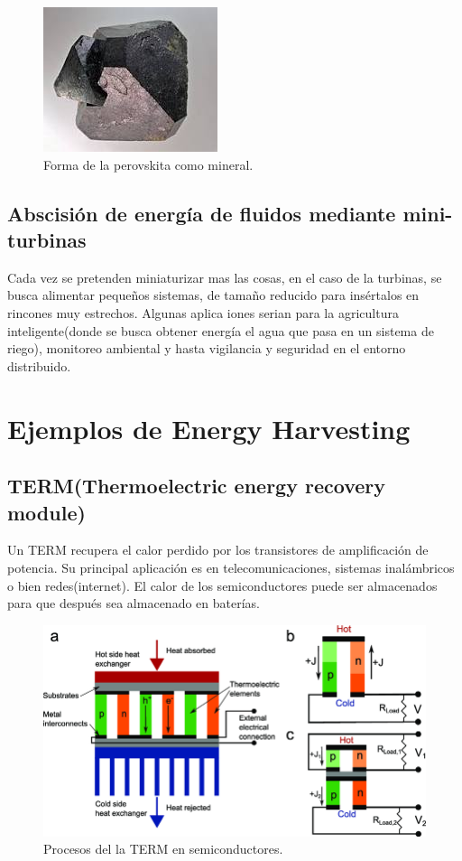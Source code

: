 \documentclass[journal, a4paper]{IEEEtran}
\begin{document}
\begin{figure}[H]
\centering
\includegraphics[scale=0.6]{peros.jpg}
\caption{Forma de la perovskita como mineral.}
\label{fig:figura1}
\end{figure}

\subsection{Abscisión de energía de fluidos mediante mini-turbinas\citep{cHolmes2015}}
Cada vez se pretenden miniaturizar mas las cosas, en el caso de la turbinas, se busca alimentar pequeños sistemas, de tamaño reducido para insértalos en rincones muy estrechos. Algunas aplica iones serian para la agricultura inteligente(donde se busca obtener energía el agua que pasa en un sistema de riego), monitoreo ambiental y hasta vigilancia y seguridad en el entorno distribuido. 

\section{Ejemplos de Energy Harvesting}
\subsection{TERM(Thermoelectric energy recovery module)}
Un TERM\citep{Kim2010} recupera el calor perdido por los transistores de amplificación de potencia. Su principal aplicación es en telecomunicaciones, sistemas inalámbricos o bien redes(internet). El calor de los semiconductores puede ser almacenados para que después sea almacenado en baterías. 

\begin{figure}[H]
\centering
\includegraphics[scale=0.3]{term.png}
\caption{Procesos del la TERM en semiconductores.}
\label{fig:figura1}
\end{figure}
\end{document}

